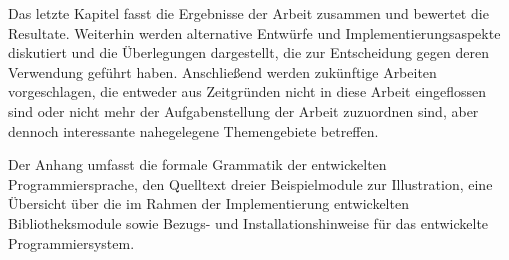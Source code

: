 Das letzte Kapitel fasst die Ergebnisse der Arbeit zusammen und
bewertet die Resultate.  Weiterhin werden alternative Entw\"urfe und
Implementierungsaspekte diskutiert und die \"Uberlegungen dargestellt,
die zur Entscheidung gegen deren Verwendung gef\"uhrt haben.
Anschlie\ss{}end werden zuk\"unftige Arbeiten vorgeschlagen, die
entweder aus Zeitgr\"unden nicht in diese Arbeit eingeflossen sind
oder nicht mehr der Aufgabenstellung der Arbeit zuzuordnen sind, aber
dennoch interessante nahegelegene Themengebiete betreffen.

Der Anhang umfasst die formale Grammatik der entwickelten
Programmiersprache, den Quelltext dreier Beispielmodule zur
Illustration, eine \"Ubersicht \"uber die im Rahmen der
Implementierung entwickelten Bibliotheksmodule sowie Bezugs- und
Installationshinweise f\"ur das entwickelte Programmiersystem.



